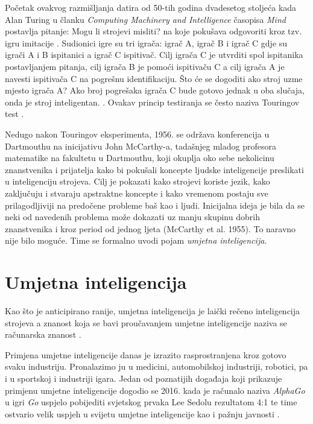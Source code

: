 \documentclass[times, utf8, zavrsni]{fer}
\begin{document}
Početak ovakvog razmišljanja datira od 50-tih godina dvadesetog stoljeća kada Alan Turing u članku \textit{Computing Machinery and Intelligence} časopisa \textit{Mind} postavlja pitanje: Mogu li strojevi misliti?  na koje pokušava odgovoriti kroz tzv. igru imitacije . Sudionici igre su tri igrača: igrač A, igrač B i igrač C gdje su igrači A i B ispitanici a igrač C ispitivač. Cilj igrača C je utvrditi spol ispitanika postavljanjem pitanja, cilj igrača B je pomoći ispitivaču C a cilj igrača A je navesti ispitivača C na pogrešnu identifikaciju. Što će se dogoditi ako stroj uzme mjesto igrača A? Ako broj pogrešaka igrača C bude gotovo jednak u oba slučaja, onda je stroj inteligentan. \citep{turingAI}. Ovakav princip testiranja se često naziva Touringov test .

Nedugo nakon Touringov eksperimenta, 1956. se održava konferencija u Dartmouthu \citep{wiki:DART} na inicijativu John McCarthy-a, tadašnjeg mladog profesora matematike na fakultetu u Dartmouthu, koji okuplja oko sebe nekolicinu znanstvenika i prijatelja kako bi pokušali koncepte ljudske inteligencije preslikati u inteligenciju strojeva. Cilj je pokazati kako strojevi koriste jezik, kako zaključuju i stvaraju apstraktne koncepte i kako vremenom postaju sve prilagodljiviji na predočene probleme baš kao i ljudi. Inicijalna ideja je bila da se neki od navedenih problema može dokazati uz manju skupinu dobrih znanstvenika i kroz period od jednog ljeta (McCarthy et al. 1955). To naravno nije bilo moguće. Time se formalno uvodi pojam \textit{umjetna inteligencija}.

\section{Umjetna inteligencija}
Kao što je anticipirano ranije, umjetna inteligencija  je laički rečeno inteligencija strojeva a znanost koja se bavi proučavanjem umjetne inteligencije naziva se računarska znanost .

Primjena umjetne inteligencije danas je izrazito rasprostranjena kroz gotovo svaku industriju. Pronalazimo ju u medicini, automobilskoj industriji, robotici, pa i u sportskoj i industriji igara. Jedan od poznatijih događaja koji prikazuje primjenu umjetne inteligencije dogodio se 2016. kada je računalo naziva \textit{AlphaGo} u igri \textit{Go} uspjelo pobijediti svjetskog prvaka Lee Sedolu rezultatom 4:1 te time ostvario velik uspjeh u svijetu umjetne inteligencije kao i pažnju javnosti \citep{moyerGO}.
\end{document}
